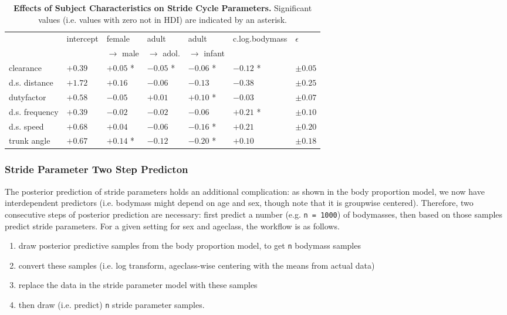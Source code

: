 \begin{table}[p]
\caption{\label{tab:strideresults}\textbf{Effects of Subject Characteristics on Stride Cycle Parameters.} Significant values (i.e. values with zero not in HDI) are indicated by an asterisk.}
\centering
\begin{small}
\begin{tabular}{|l|l|l|l|l|l|l|}
\hline
 & intercept & female  & adult  & adult  & c.log.bodymass & \(\epsilon\)\\[0pt]
 &  & \(\rightarrow\) male & \(\rightarrow\) adol. & \(\rightarrow\) infant &  & \\[0pt]
\hline
clearance & \(+0.39\) & \(+0.05\) * & \(-0.05\) * & \(-0.06\) * & \(-0.12\) * & \(\pm 0.05\)\\[0pt]
d.s. distance & \(+1.72\) & \(+0.16\) & \(-0.06\) & \(-0.13\) & \(-0.38\) & \(\pm 0.25\)\\[0pt]
dutyfactor & \(+0.58\) & \(-0.05\) & \(+0.01\) & \(+0.10\) * & \(-0.03\) & \(\pm 0.07\)\\[0pt]
d.s. frequency & \(+0.39\) & \(-0.02\) & \(-0.02\) & \(-0.06\) & \(+0.21\) * & \(\pm 0.10\)\\[0pt]
d.s. speed & \(+0.68\) & \(+0.04\) & \(-0.06\) & \(-0.16\) * & \(+0.21\) & \(\pm 0.20\)\\[0pt]
trunk angle & \(+0.67\) & \(+0.14\) * & \(-0.12\) & \(-0.20\) * & \(+0.10\) & \(\pm 0.18\)\\[0pt]
\hline
\end{tabular}
\end{small}
\end{table}


\subsubsection{Stride Parameter Two Step Predicton}
\label{sec:org3879560}
The posterior prediction of stride parameters holds an additional complication: as shown in the body proportion model, we now have interdependent predictors (i.e. bodymass might depend on age and sex, though note that it is groupwise centered).
Therefore, two consecutive steps of posterior prediction are necessary: first predict a number (e.g. \texttt{n = 1000}) of bodymasses, then based on those samples predict stride parameters.
For a given setting for sex and ageclass, the workflow is as follows.
\begin{enumerate}
\item draw posterior predictive samples from the body proportion model, to get \texttt{n} bodymass samples
\item convert these samples (i.e. log transform, ageclass-wise centering with the means from actual data)
\item replace the data in the stride parameter model with these samples
\item then draw (i.e. predict) \texttt{n} stride parameter samples.
\end{enumerate}

